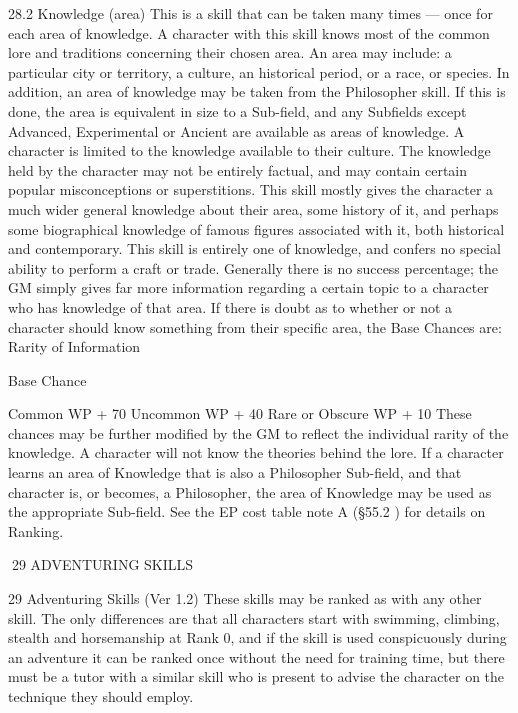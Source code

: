 \documentclass[a4paper]{article}
\begin{document}
\begin{multicols}{3}
28.2 Knowledge (area)
This is a skill that can be taken many times — once
for each area of knowledge. A character with this
skill knows most of the common lore and traditions
concerning their chosen area. An area may include:
a particular city or territory, a culture, an historical
period, or a race, or species. In addition, an area of
knowledge may be taken from the Philosopher
skill. If this is done, the area is equivalent in size to
a Sub-field, and any Subfields except Advanced,
Experimental or Ancient are available as areas of
knowledge.
A character is limited to the knowledge available to
their culture. The knowledge held by the character
may not be entirely factual, and may contain certain popular misconceptions or superstitions. This
skill mostly gives the character a much wider general knowledge about their area, some history of it,
and perhaps some biographical knowledge of famous figures associated with it, both historical and
contemporary. This skill is entirely one of knowledge, and confers no special ability to perform a
craft or trade.
Generally there is no success percentage; the GM
simply gives far more information regarding a
certain topic to a character who has knowledge of
that area. If there is doubt as to whether or not a
character should know something from their specific area, the Base Chances are:
Rarity of Information

Base Chance

Common
WP + 70%
Uncommon
WP + 40%
Rare or Obscure
WP + 10%
These chances may be further modified by the GM
to reflect the individual rarity of the knowledge. A
character will not know the theories behind the
lore.
If a character learns an area of Knowledge that is
also a Philosopher Sub-field, and that character is,
or becomes, a Philosopher, the area of Knowledge
may be used as the appropriate Sub-field. See the
EP cost table note A (§55.2 ) for details on Ranking.

29 ADVENTURING SKILLS

29 Adventuring Skills (Ver 1.2)
These skills may be ranked as with any other skill.
The only differences are that all characters start
with swimming, climbing, stealth and horsemanship at Rank 0, and if the skill is used conspicuously during an adventure it can be ranked once
without the need for training time, but there must
be a tutor with a similar skill who is present to
advise the character on the technique they should
employ.


\end{multicols}
\end{document}
